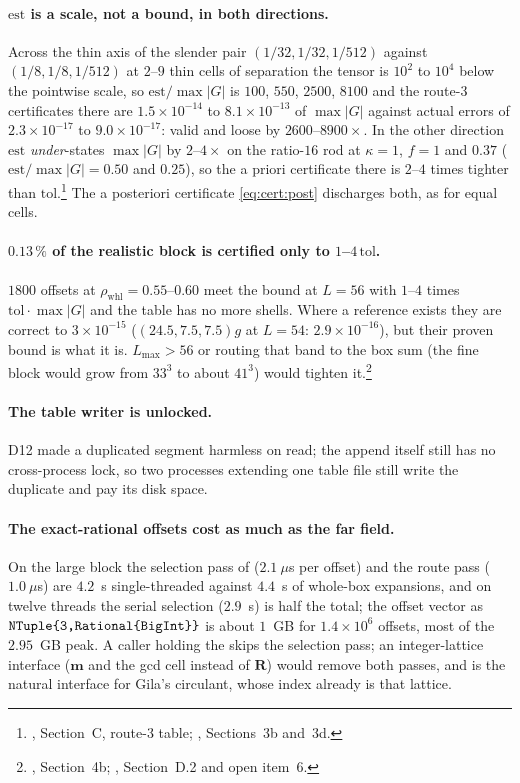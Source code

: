 \paragraph{$\mathrm{est}$ is a scale, not a bound, in both directions.} Across the thin
axis of the slender pair $(1/32,1/32,1/512)$ against $(1/8,1/8,1/512)$ at $2$--$9$ thin
cells of separation the tensor is $10^{2}$ to $10^{4}$ below the pointwise scale, so
$\mathrm{est}/\max|G|$ is $100$, $550$, $2500$, $8100$ and the route-3 certificates there
are $1.5\times10^{-14}$ to $8.1\times10^{-13}$ of $\max|G|$ against actual errors of
$2.3\times10^{-17}$ to $9.0\times10^{-17}$: valid and loose by $2600$--$8900\times$. In the
other direction $\mathrm{est}$ \emph{under}-states $\max|G|$ by $2$--$4\times$ on the
ratio-$16$ rod at $\kappa = 1$, $f = 1$ and $0.37$ ($\mathrm{est}/\max|G| = 0.50$ and
$0.25$), so the a priori certificate there is $2$--$4$ times tighter than
$\mathrm{tol}$.\footnote{, Section~C, route-3 table;
, Sections~3b and~3d.} The a posteriori certificate \eqref{eq:cert:post}
discharges both, as for equal cells.

\paragraph{$0.13\,\%$ of the realistic block is certified only to $1$--$4\,\mathrm{tol}$.}
$1800$ offsets at $\rho_{\mathrm{whl}} = 0.55$--$0.60$ meet the bound at $L = 56$ with
$1$--$4$ times $\mathrm{tol}\cdot\max|G|$ and the table has no more shells. Where a
reference exists they are correct to $3\times10^{-15}$ ($(24.5,7.5,7.5)g$ at $L = 54$:
$2.9\times10^{-16}$), but their proven bound is what it is. $L_{\max}>56$ or routing that
band to the box sum (the fine block would grow from $33^3$ to about $41^3$) would tighten
it.\footnote{, Section~4b; , Section~D.2 and
open item~6.}

\paragraph{The table writer is unlocked.} D12 made a duplicated segment harmless on read;
the append itself still has no cross-process lock, so two processes extending one table file
still write the duplicate and pay its disk space.

\paragraph{The exact-rational offsets cost as much as the far field.} On the large block the
selection pass of  ($2.1~\mu$s per offset) and the route pass
($1.0~\mu$s) are $4.2$~s single-threaded against $4.4$~s of whole-box expansions, and on
twelve threads the serial selection ($2.9$~s) is half the total; the offset vector as
$\texttt{NTuple\{3,Rational\{BigInt\}\}}$ is about $1$~GB for $1.4\times10^{6}$ offsets, most
of the $2.95$~GB peak. A caller holding the  skips the selection pass; an
integer-lattice interface ($\mathbf{m}$ and the gcd cell instead of $\mathbf{R}$) would
remove both passes, and is the natural interface for Gila's circulant, whose index already
is that lattice.

